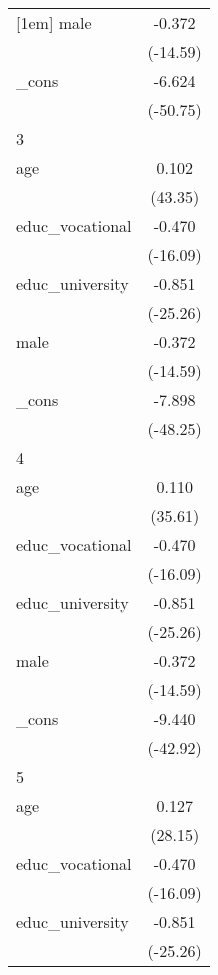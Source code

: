 {\begin{tabular}{l*{1}{c}}
[1em]
male        &      -0.372\sym{***}\\
            &    (-14.59)         \\
[1em]
\_cons      &      -6.624\sym{***}\\
            &    (-50.75)         \\
\hline
3           &                     \\
age         &       0.102\sym{***}\\
            &     (43.35)         \\
[1em]
educ\_vocational&      -0.470\sym{***}\\
            &    (-16.09)         \\
[1em]
educ\_university&      -0.851\sym{***}\\
            &    (-25.26)         \\
[1em]
male        &      -0.372\sym{***}\\
            &    (-14.59)         \\
[1em]
\_cons      &      -7.898\sym{***}\\
            &    (-48.25)         \\
\hline
4           &                     \\
age         &       0.110\sym{***}\\
            &     (35.61)         \\
[1em]
educ\_vocational&      -0.470\sym{***}\\
            &    (-16.09)         \\
[1em]
educ\_university&      -0.851\sym{***}\\
            &    (-25.26)         \\
[1em]
male        &      -0.372\sym{***}\\
            &    (-14.59)         \\
[1em]
\_cons      &      -9.440\sym{***}\\
            &    (-42.92)         \\
\hline
5           &                     \\
age         &       0.127\sym{***}\\
            &     (28.15)         \\
[1em]
educ\_vocational&      -0.470\sym{***}\\
            &    (-16.09)         \\
[1em]
educ\_university&      -0.851\sym{***}\\
            &    (-25.26)         \\

\end{tabular}}

